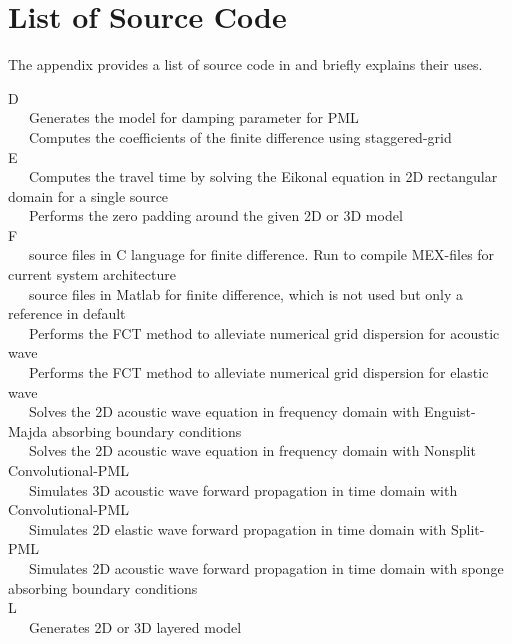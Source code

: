 \documentclass[11pt,titlepage]{article}
\theoremstyle{plain}
\theoremstyle{definition}
\theoremstyle{remark}
\numberwithin{equation}{section}
\begin{document}
\section{List of Source Code}
The appendix provides a list of source code in  and briefly explains their uses. 

\noindent D\\
~~~Generates the model for damping parameter for PML\\
~~~Computes the coefficients of the finite difference using staggered-grid\\

\noindent E\\
~~~Computes the travel time by solving the Eikonal equation in 2D rectangular domain for a single source\\
~~~Performs the zero padding around the given 2D or 3D model\\

\noindent F\\
~~~source files in C language for finite difference. Run  to compile MEX-files for current system architecture\\
~~~source files in Matlab for finite difference, which is not used but only a reference in default\\
~~~Performs the FCT method to alleviate numerical grid dispersion for acoustic wave\\
~~~Performs the FCT method to alleviate numerical grid dispersion for elastic wave\\
~~~Solves the 2D acoustic wave equation in frequency domain with Enguist-Majda absorbing boundary conditions\\
~~~Solves the 2D acoustic wave equation in frequency domain with Nonsplit Convolutional-PML\\
~~~Simulates 3D acoustic wave forward propagation in time domain with Convolutional-PML\\
~~~Simulates 2D elastic wave forward propagation in time domain with Split-PML\\
~~~Simulates 2D acoustic wave forward propagation in time domain with sponge absorbing boundary conditions\\

\noindent L\\
~~~Generates 2D or 3D layered model\\
\end{document}
